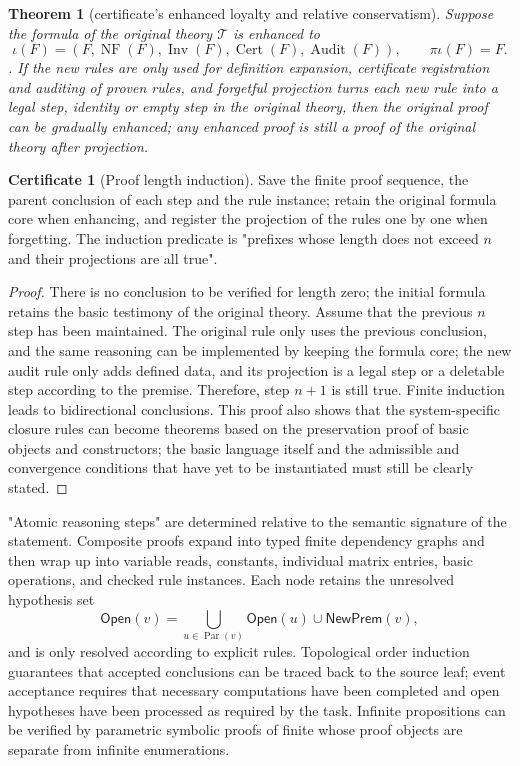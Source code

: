 \documentclass[11pt,a4paper]{article}
\theoremstyle{plain}
\newtheorem{theorem}{Theorem}[section]
\theoremstyle{definition}
\newtheorem*{certificate}{Certificate}
\theoremstyle{remark}
\begin{document}
\begin{CJK*}
\begin{theorem}
[certificate's enhanced loyalty and relative conservatism]\label{pc:conservative}
Suppose the formula of the original theory $\mathcal T$ is enhanced to \[
 \iota(F)=(F,\operatorname{NF}(F),\operatorname{Inv}(F),
                  \operatorname{Cert}(F),\operatorname{Audit}(F)),
 \qquad \pi\iota(F)=F.
\]. If the new rules are only used for definition expansion, certificate registration and auditing of proven rules, and forgetful projection turns each new rule into a legal step, identity or empty step in the original theory, then the original proof can be gradually enhanced; any enhanced proof is still a proof of the original theory after projection.\end{theorem}
\begin{certificate}
[Proof length induction]Save the finite proof sequence, the parent conclusion of each step and the rule instance; retain the original formula core when enhancing, and register the projection of the rules one by one when forgetting. The induction predicate is "prefixes whose length does not exceed $n$ and their projections are all true".\end{certificate}
\begin{proof}
There is no conclusion to be verified for length zero; the initial formula retains the basic testimony of the original theory. Assume that the previous $n$ step has been maintained. The original rule only uses the previous conclusion, and the same reasoning can be implemented by keeping the formula core; the new audit rule only adds defined data, and its projection is a legal step or a deletable step according to the premise. Therefore, step $n+1$ is still true. Finite induction leads to bidirectional conclusions. This proof also shows that the system-specific closure rules can become theorems based on the preservation proof of basic objects and constructors; the basic language itself and the admissible and convergence conditions that have yet to be instantiated must still be clearly stated.\end{proof}


"Atomic reasoning steps" are determined relative to the semantic signature of the statement. Composite proofs expand into typed finite dependency graphs and then wrap up into variable reads, constants, individual matrix entries, basic operations, and checked rule instances. Each node retains the unresolved hypothesis set \[
 \mathsf{Open}(v)=\bigcup_{u\in\operatorname{Par}(v)}\mathsf{Open}(u)
                   \cup\mathsf{NewPrem}(v),
\] and is only resolved according to explicit rules. Topological order induction guarantees that accepted conclusions can be traced back to the source leaf; event acceptance requires that necessary computations have been completed and open hypotheses have been processed as required by the task. Infinite propositions can be verified by parametric symbolic proofs of finite whose proof objects are separate from infinite enumerations.


\end{CJK*}
\end{document}
